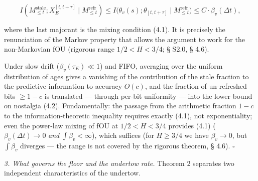 \documentclass[12pt]{iopart}
\begin{document}
\[I(M_{\le t}^{\text{stale}}; X_E^{[t,t+\tau]}\mid M_{\le t}^{\text{refr}}) \le I\big(\theta_v(s); \theta_{[t,t+\tau]}\mid M_{\le t}^{\text{refr}}\big) \le C\cdot\beta_v(\Delta t),\]



where the last majorant is the mixing condition (4.1). It is precisely the renunciation of the Markov property that allows the argument to work for the non-Markovian fOU (rigorous range \(1/2 < H < 3/4\); § S2.0, § 4.6).



Under slow drift (\(\beta_v(\tau_E) \ll 1\)) and FIFO, averaging over the uniform distribution of ages gives a vanishing of the contribution of the stale fraction to the predictive information to accuracy \(O(c)\), and the fraction of un-refreshed bits \(\ge 1-c\) is translated --- through per-bit uniformity --- into the lower bound on nostalgia (4.2). Fundamentally: the passage from the arithmetic fraction \(1-c\) to the information-theoretic inequality requires exactly (4.1), not exponentiality; even the power-law mixing of fOU at \(1/2 < H < 3/4\) provides (4.1) (\(\beta_v(\Delta t) \to 0\) \emph{and} \(\int\beta_v < \infty\)), which suffices (for \(H \ge 3/4\) we have \(\beta_v\to0\), but \(\int\beta_v\) diverges --- the range is not covered by the rigorous theorem, § 4.6). \(\square\)



\emph{3. What governs the floor and the undertow rate.} Theorem 2 separates two independent characteristics of the undertow.
\end{document}
